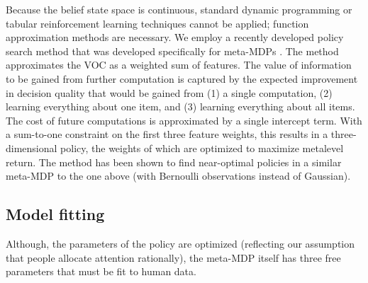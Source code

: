 \documentclass[12pt,a4paperpaper,]{article}
\begin{document}
Because the belief state space is continuous, standard dynamic programming or tabular reinforcement learning techniques cannot be applied; function approximation methods are necessary. We employ a recently developed policy search method that was developed specifically for meta-MDPs \citep{callaway2018learning}. The method approximates the VOC as a weighted sum of features. The value of information to be gained from further computation is captured by the expected improvement in decision quality that would be gained from (1) a single computation, (2) learning everything about one item, and (3) learning everything about all items. The cost of future computations is approximated by a single intercept term. With a sum-to-one constraint on the first three feature weights, this results in a three-dimensional policy, the weights of which are optimized to maximize metalevel return. The method has been shown to find near-optimal policies in a similar meta-MDP to the one above (with Bernoulli observations instead of Gaussian).





\subsection{Model fitting}
Although, the parameters of the policy are optimized (reflecting our assumption that people allocate attention rationally), the meta-MDP itself has three free parameters that must be fit to human data.
\end{document}
